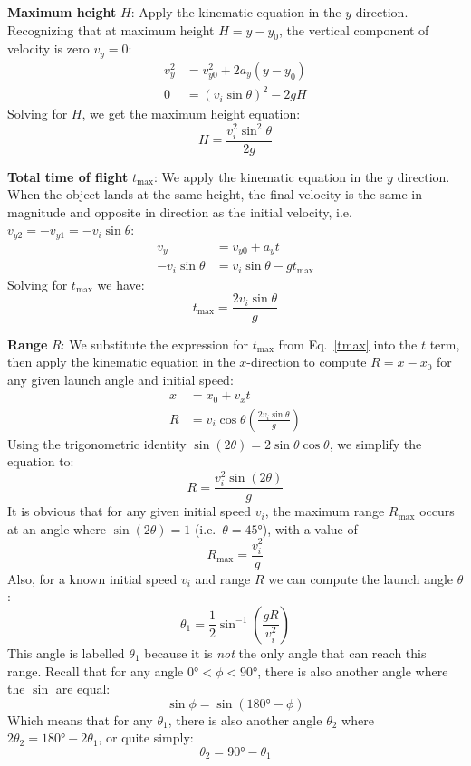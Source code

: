 \documentclass{../../../Physics.12/ossphys}
\begin{document}
\textbf{Maximum height} $H$: Apply the kinematic equation in the $y$-direction.
Recognizing that at maximum height $H=y-y_0$, the vertical component of
velocity is zero $v_y=0$:
\begin{align*}
  v_y^2 &= v_{y0}^2 + 2a_y(y-y_0)\\
  0  &= (v_i\sin\theta)^2-2gH
\end{align*}
Solving for $H$, we get the maximum height equation:
\begin{equation}
  \boxed{H=\frac{v_i^2\sin^2\theta}{2g}}
\end{equation}
\newpage

\textbf{Total time of flight} $t_\mathrm{max}$: We apply the kinematic equation
in the $y$ direction. When the object lands at the same height, the final
velocity is the same in magnitude and opposite in direction as the initial
velocity, i.e.\  $v_{y2}=-v_{y1}=-v_i\sin\theta$:
\begin{align*}
  v_y &=v_{y0}+a_yt\\
  -v_i\sin\theta &=v_i\sin\theta -g t_\mathrm{max}
\end{align*}
Solving for $t_\mathrm{max}$ we have:
\begin{equation}
  \boxed{t_\mathrm{max}=\frac{2v_i\sin\theta}{g}}
  \label{tmax}
\end{equation}

\textbf{Range} $R$: We substitute the expression for $t_\mathrm{max}$ from
Eq.~\ref{tmax} into the $t$ term, then apply the kinematic equation in
the $x$-direction to compute $R=x-x_0$ for any given launch angle and initial
speed:
\begin{align*}
  x&=x_0+v_xt\\
  R &=v_i\cos\theta\left(\frac{2v_i\sin\theta}{g}\right)
\end{align*}
Using the trigonometric identity $\sin(2\theta)=2\sin\theta\cos\theta$, we
simplify the equation to:
\begin{equation}
  \boxed{R=\frac{v_i^2\sin(2\theta)}{g}}
\end{equation}
It is obvious that for any given initial speed $v_i$, the maximum range
$R_\mathrm{max}$ occurs at an angle where $\sin(2\theta)=1$
(i.e.\ $\theta=\ang{45}$), with a value of
\begin{equation}
  \boxed{R_\mathrm{max}=\frac{v_i^2}{g}}
\end{equation}
Also, for a known initial speed $v_i$ and range $R$ we can compute the launch
angle $\theta$:
\begin{displaymath}
  \theta_1=\frac{1}{2}\sin^{-1}\left(\frac{gR}{v_i^2}\right)
\end{displaymath}
This angle is labelled $\theta_1$ because it is \emph{not} the only angle that
can reach this range. Recall that for any angle $\ang{0}<\phi<\ang{90}$, there
is also another angle where the $\sin$ are equal:
\begin{displaymath}
  \sin\phi=\sin(\ang{180}-\phi)
\end{displaymath}
Which means that for any $\theta_1$, there is also another angle
$\theta_2$ where $2\theta_2=\ang{180}-2\theta_1$, or quite simply:
\begin{displaymath}
  \theta_2=\ang{90}-\theta_1
\end{displaymath}
\end{document}
